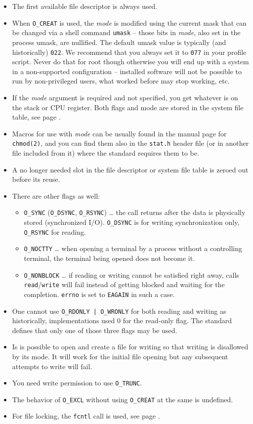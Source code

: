 \begin{itemize}
\item The first available file descriptor is always used.  
\item When \texttt{O\_CREAT} is used, the \emph{mode} is modified using the
current mask that can be changed via a shell command \texttt{umask} -- those
bits in \emph{mode}, also set in the process umask, are nullified.  The
default umask value is typically (and historically) \texttt{022}.  We recommend
that you always set it to \texttt{077} in your profile script.  Never do that for
root though otherwise you will end up with a system in a non-supported
configuration -- installed software will not be possible to run by
non-privileged users, what worked before may stop working, etc.
\item If the \emph{mode} argument is required and not specified, you get
whatever is on the stack or CPU register. Both flags and mode are stored in the
system file table, see page \pageref{OPENFILETABLES}.
\item Macros for use with \emph{mode} can be usually found in the manual page
for \texttt{chmod(2)}, and you can find them also in the \texttt{stat.h} header
file (or in another file included from it) where the standard requires them to
be.
\item A no longer needed slot in the file descriptor or system file table is
zeroed out before its reuse.
\item There are other flags as well:
\begin{itemize}
\item \texttt{O\_SYNC} (\texttt{O\_DSYNC}, \texttt{O\_RSYNC}) \dots{} the call
returns after the data is physically stored (synchronized I/O).
\texttt{O\_DSYNC} is for writing synchronization only, \texttt{O\_RSYNC} for
reading.
\item \texttt{O\_NOCTTY} \dots{} when opening a terminal by a process without a
controlling terminal, the terminal being opened does not become it.
\item \label{O_NONBLOCK} \texttt{O\_NONBLOCK} \dots{} if reading or writing
cannot be satisfied right away, calls \texttt{read}/\texttt{write} will fail
instead of getting blocked and waiting for the completion.  \texttt{errno} is
set to \texttt{EAGAIN} in such a case.
\end{itemize}
\item One cannot use \texttt{O\_RDONLY | O\_WRONLY} for both reading and writing
as historically, implementations used 0 for the read-only flag.  The standard
defines that only one of those three flags may be used.
\item Is is possible to open and create a file for writing so that writing is
disallowed by its mode.  It will work for the initial file opening but any subsequent
attempts to write will fail.
\item You need write permission to use \texttt{O\_TRUNC}.
\item The behavior of \texttt{O\_EXCL} without using \texttt{O\_CREAT} at the
same is undefined.
\item For file locking, the \texttt{fcntl} call is used, see page
\pageref{FCNTL}.
\end{itemize}


